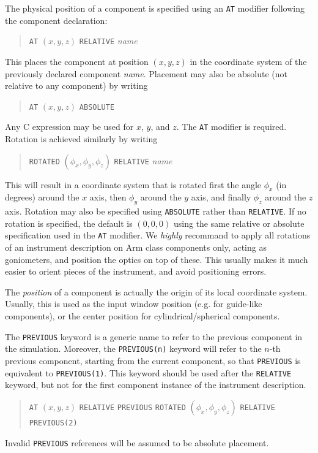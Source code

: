 The physical position of a component is specified using an \texttt{AT} modifier
following the component declaration:
  
\begin{quote}
  \texttt{AT} $(x,y,z)$ \texttt{RELATIVE} \textit{name}
\end{quote}
This places the component at position $(x,y,z)$ in the coordinate system
of the previously declared component \textit{name}. Placement may also
be absolute (not relative to any component) by writing
\begin{quote}
  \texttt{AT} $(x,y,z)$ \texttt{ABSOLUTE}
\end{quote}
Any C expression may be used for $x$, $y$, and $z$. The \texttt{AT}
modifier is required.
Rotation is achieved similarly by writing 
\begin{quote}
  \texttt{ROTATED} $(\phi_x,\phi_y,\phi_z)$ \texttt{RELATIVE} \textit{name}
\end{quote}
This will result in a coordinate system that is rotated first the angle
$\phi_x$ (in degrees) around the $x$ axis, then $\phi_y$ around the $y$ axis, and finally
$\phi_z$ around the $z$ axis. Rotation may also be specified using
\texttt{ABSOLUTE} rather than \texttt{RELATIVE}. If no rotation is
specified, the default is $(0,0,0)$ using the same relative or absolute
specification used in the \texttt{AT} modifier. We \emph{highly} recommand to apply all rotations of an instrument description on Arm class components only, acting as goniometers, and position the optics on top of these. This usually makes it much easier to orient pieces of the instrument, and avoid positioning errors.

The \emph{position} of
a component is actually the origin of its local coordinate
system. Usually, this is used as the input window position (e.g. for
guide-like components), or the center position for
cylindrical/spherical components.

The \texttt{PREVIOUS}  keyword is a generic name to refer to the previous component in the simulation. Moreover, the \texttt{PREVIOUS(n)} keyword will refer to the $n$-th previous component, starting from the current component, so that \texttt{PREVIOUS} is equivalent to \texttt{PREVIOUS(1)}. This keyword should be used after the \texttt{RELATIVE} keyword, but not for the first component instance of the instrument description.
\begin{quote}
  \texttt{AT} $(x,y,z)$ \texttt{RELATIVE} \texttt{PREVIOUS}
  \texttt{ROTATED} $(\phi_x,\phi_y,\phi_z)$ \texttt{RELATIVE} \texttt{PREVIOUS(2)}
\end{quote}
Invalid \texttt{PREVIOUS} references will be assumed to be absolute placement.

